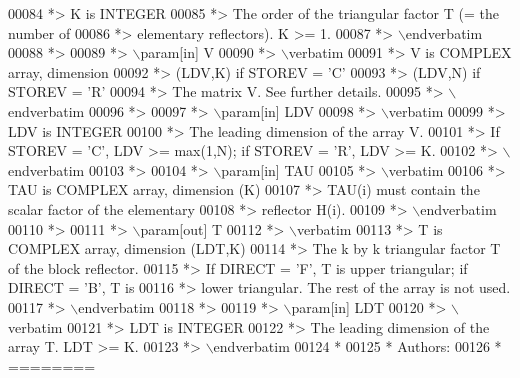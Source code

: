 \begin{DoxyCode}
00084 \textcolor{comment}{*>          K is INTEGER}
00085 \textcolor{comment}{*>          The order of the triangular factor T (= the number of}
00086 \textcolor{comment}{*>          elementary reflectors). K >= 1.}
00087 \textcolor{comment}{*> \(\backslash\)endverbatim}
00088 \textcolor{comment}{*>}
00089 \textcolor{comment}{*> \(\backslash\)param[in] V}
00090 \textcolor{comment}{*> \(\backslash\)verbatim}
00091 \textcolor{comment}{*>          V is COMPLEX array, dimension}
00092 \textcolor{comment}{*>                               (LDV,K) if STOREV = 'C'}
00093 \textcolor{comment}{*>                               (LDV,N) if STOREV = 'R'}
00094 \textcolor{comment}{*>          The matrix V. See further details.}
00095 \textcolor{comment}{*> \(\backslash\)endverbatim}
00096 \textcolor{comment}{*>}
00097 \textcolor{comment}{*> \(\backslash\)param[in] LDV}
00098 \textcolor{comment}{*> \(\backslash\)verbatim}
00099 \textcolor{comment}{*>          LDV is INTEGER}
00100 \textcolor{comment}{*>          The leading dimension of the array V.}
00101 \textcolor{comment}{*>          If STOREV = 'C', LDV >= max(1,N); if STOREV = 'R', LDV >= K.}
00102 \textcolor{comment}{*> \(\backslash\)endverbatim}
00103 \textcolor{comment}{*>}
00104 \textcolor{comment}{*> \(\backslash\)param[in] TAU}
00105 \textcolor{comment}{*> \(\backslash\)verbatim}
00106 \textcolor{comment}{*>          TAU is COMPLEX array, dimension (K)}
00107 \textcolor{comment}{*>          TAU(i) must contain the scalar factor of the elementary}
00108 \textcolor{comment}{*>          reflector H(i).}
00109 \textcolor{comment}{*> \(\backslash\)endverbatim}
00110 \textcolor{comment}{*>}
00111 \textcolor{comment}{*> \(\backslash\)param[out] T}
00112 \textcolor{comment}{*> \(\backslash\)verbatim}
00113 \textcolor{comment}{*>          T is COMPLEX array, dimension (LDT,K)}
00114 \textcolor{comment}{*>          The k by k triangular factor T of the block reflector.}
00115 \textcolor{comment}{*>          If DIRECT = 'F', T is upper triangular; if DIRECT = 'B', T is}
00116 \textcolor{comment}{*>          lower triangular. The rest of the array is not used.}
00117 \textcolor{comment}{*> \(\backslash\)endverbatim}
00118 \textcolor{comment}{*>}
00119 \textcolor{comment}{*> \(\backslash\)param[in] LDT}
00120 \textcolor{comment}{*> \(\backslash\)verbatim}
00121 \textcolor{comment}{*>          LDT is INTEGER}
00122 \textcolor{comment}{*>          The leading dimension of the array T. LDT >= K.}
00123 \textcolor{comment}{*> \(\backslash\)endverbatim}
00124 \textcolor{comment}{*}
00125 \textcolor{comment}{*  Authors:}
00126 \textcolor{comment}{*  ========}

\end{DoxyCode}

